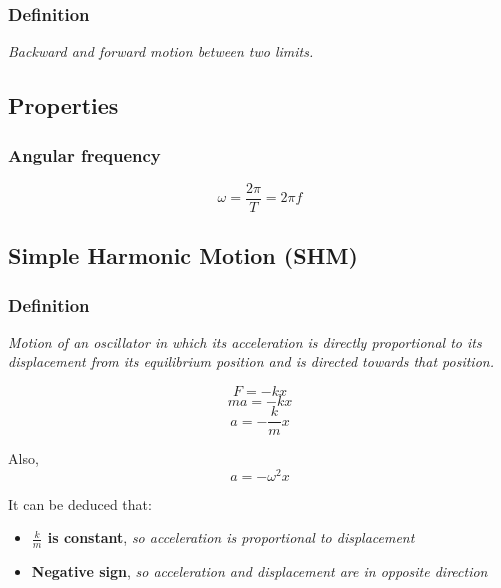 \documentclass[a4paper,9pt]{scrartcl}
\begin{document}
    \subsubsection{Definition}
    \textit{Backward and forward motion between two limits.}

    \subsection{Properties}

    \subsubsection{Angular frequency}
    \begin{displaymath}
        \omega = \frac{2\pi}{T} = 2{\pi}f
    \end{displaymath}

    \subsection{Simple Harmonic Motion (SHM)}

    \subsubsection{Definition}
    \textit{Motion of an oscillator in which its acceleration is directly proportional to its displacement from its equilibrium position and is directed towards that position.}

    \begin{displaymath}
        F = -kx
    \end{displaymath}
    \begin{displaymath}
        ma = -kx
    \end{displaymath}
    \begin{displaymath}
        a = -\frac{k}{m}x
    \end{displaymath}

    Also,
    \begin{displaymath}
        a = -{{\omega}^2}x
    \end{displaymath}

    It can be deduced that:
    \begin{itemize}
        \item \textbf{$\frac{k}{m}$ is constant}, \textit{so acceleration is proportional to displacement}
        \item \textbf{Negative sign}, \textit{so acceleration and displacement are in opposite direction}
    \end{itemize}
\end{document}
